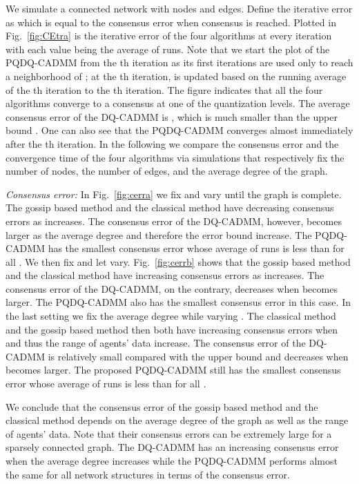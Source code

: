 \documentclass[journal]{IEEEtran}
\begin{document}
We simulate a connected network with  nodes and  edges. Define the iterative error as  which is equal to the consensus error  when consensus is reached. Plotted in Fig.~\ref{fig:CEtra} is the iterative error of the four algorithms at every iteration  with each value being the average of  runs. Note that we start the plot of the PQDQ-CADMM from the th iteration as its first  iterations are used only to reach a neighborhood of ; at the th iteration,  is updated based on the running average of the th iteration to the th iteration. The figure indicates that all the four algorithms converge to a consensus at one of the quantization levels. The average consensus error of the DQ-CADMM is , which is much smaller than the upper bound . One can also see that the PQDQ-CADMM converges almost immediately after the th iteration. In the following we compare the consensus error and the convergence time of the four algorithms via simulations that respectively fix the number of nodes, the number of edges, and the average degree of the graph.

{\it Consensus error:}
In Fig.~\ref{fig:cerra} we fix  and vary  until the graph is complete. The gossip based method and the classical method have decreasing consensus errors as  increases. The consensus error of the DQ-CADMM, however, becomes larger as the average degree and therefore the error bound increase. The PQDQ-CADMM has the smallest consensus error whose average of  runs is less than  for all . We then fix  and let  vary. Fig.~\ref{fig:cerrb} shows that the gossip based method and the classical method have increasing consensus errors as  increases. The consensus error of the DQ-CADMM, on the contrary, decreases when  becomes larger. The PQDQ-CADMM also has the smallest consensus error in this case. In the last setting we fix the average degree  while varying . The classical method and the gossip based method then both have increasing consensus errors when  and thus the range of agents' data increase. The consensus error of the DQ-CADMM is relatively small compared with the upper bound  and decreases when  becomes larger. The proposed PQDQ-CADMM still has the smallest consensus error whose average of  runs is less than  for all .  
 
We conclude that the consensus error of the gossip based method and the classical method depends on the average degree of the graph as well as the range of agents' data. Note that their consensus errors can be extremely large for a sparsely connected graph. The DQ-CADMM has an increasing consensus error when the average degree increases while the PQDQ-CADMM performs almost the same for all network structures in terms of the consensus error. 
\end{document}
